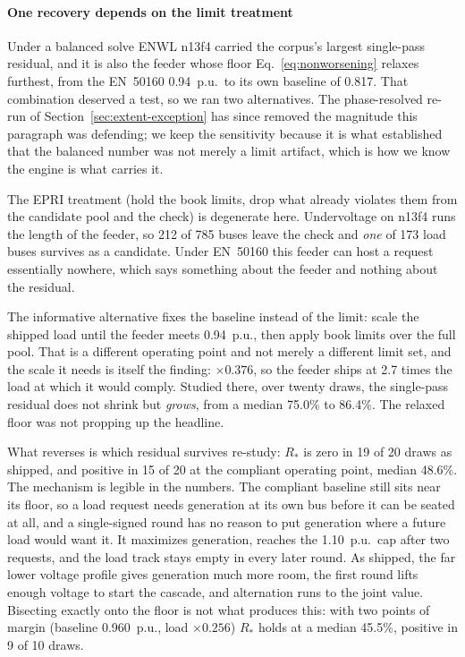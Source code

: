 \documentclass[review,authoryear,12pt]{elsarticle}
\begin{document}
\paragraph{One recovery depends on the limit treatment}
Under a balanced solve ENWL n13f4 carried the corpus's largest single-pass
residual, and it is also the feeder whose floor Eq.~\eqref{eq:nonworsening}
relaxes furthest, from the EN~50160 0.94~p.u.\ to its own baseline of 0.817.
That combination deserved a test, so we ran two alternatives. The
phase-resolved re-run of
Section~\ref{sec:extent-exception} has since removed the magnitude this
paragraph was defending; we keep the sensitivity because it is what established
that the balanced number was not merely a limit artifact, which is how we know
the engine is what carries it.

The EPRI treatment (hold the book limits, drop what already violates them from
the candidate pool and the check) is degenerate here. Undervoltage on
n13f4 runs the length of the feeder, so 212 of 785 buses leave the check and
\emph{one} of 173 load buses survives as a candidate. Under EN~50160 this
feeder can host a request essentially nowhere, which says something about the
feeder and nothing about the residual.

The informative alternative fixes the baseline instead of the limit: scale the
shipped load until the feeder meets 0.94~p.u., then apply book limits over the
full pool. That is a different operating point and not merely a different limit
set, and the scale it needs is itself the finding: $\times 0.376$, so the
feeder ships at 2.7 times the load at which it would comply. Studied there,
over twenty draws, the single-pass residual does not shrink but \emph{grows},
from a median 75.0\% to 86.4\%. The relaxed floor was not propping up the
headline.

What reverses is which residual survives re-study: $R_{\ast}$ is zero in 19 of
20 draws as shipped, and positive in 15 of 20 at the compliant operating point,
median 48.6\%. The mechanism is legible in the numbers. The compliant baseline
still sits near its floor, so a load request needs generation at its own bus
before it can be seated at all, and a single-signed round has no reason to put
generation where a future load would want it. It maximizes generation, reaches
the 1.10~p.u.\ cap after two requests, and the load track stays empty in every
later round. As shipped, the far lower voltage profile gives
generation much more room, the first round lifts enough voltage to start the
cascade, and alternation runs to the joint value. Bisecting exactly onto the
floor is not what produces this: with two points of margin (baseline
0.960~p.u., load $\times 0.256$) $R_{\ast}$ holds at a median 45.5\%, positive
in 9 of 10 draws.
\end{document}
